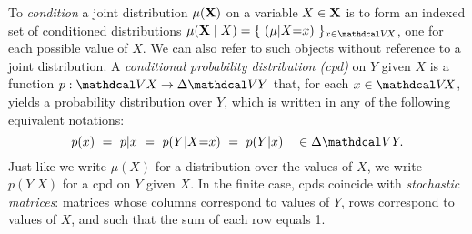 To \emph{condition} a joint distribution $\mu(\mathbf X)$ on a variable $X \in \mathbf X$ is to form an indexed set of conditioned distributions $\mu(\mat X \mid X) = \{ ~(\mu|X{=}x) ~\}_{x \in \V\!X}$, one for each possible value of $X$. 
We can also refer to such objects without reference to a joint distribution.
%
%
A \emph{conditional probability distribution (cpd)} on $Y$ given $X$ is a function $p : \V X \to \Delta \V Y$ that, for each $x \in \V\!X$, yields a probability distribution over $Y$,
which is written in any of the following equivalent notations:
\[ 
p(x) ~=~ p|x ~=~ p(Y | X{=}x) ~=~ p(Y | x) \quad \in \Delta \V Y.
\]
Just like we write $\mu(X)$ for a distribution over the values of $X$, we
write $p(Y|X)$ for a cpd on $Y$ given $X$. 
In the finite case, cpds coincide with \emph{stochastic matrices}: matrices whose columns correspond to values of $Y$, rows correspond to values of $X$, and such that the sum of each row equals 1. 

